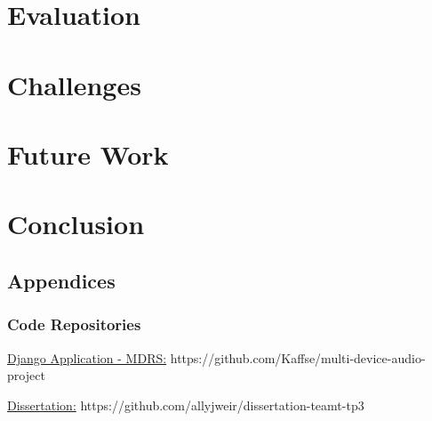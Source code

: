 \documentclass{l3proj}
\begin{document}
\chapter{Evaluation}


\chapter{Challenges}
\label{Challenges}   


\chapter{Future Work}
\label{Future Work}

\chapter{Conclusion}
\label{Conclusion}


\newpage

{}


\section{Appendices}
\subsection{Code Repositories}

\href{https://github.com/Kaffse/multi-device-audio-project}{Django Application - MDRS:}
https://github.com/Kaffse/multi-device-audio-project

\href{https://github.com/allyjweir/dissertation-teamt-tp3}{Dissertation:}
https://github.com/allyjweir/dissertation-teamt-tp3
\end{document}

